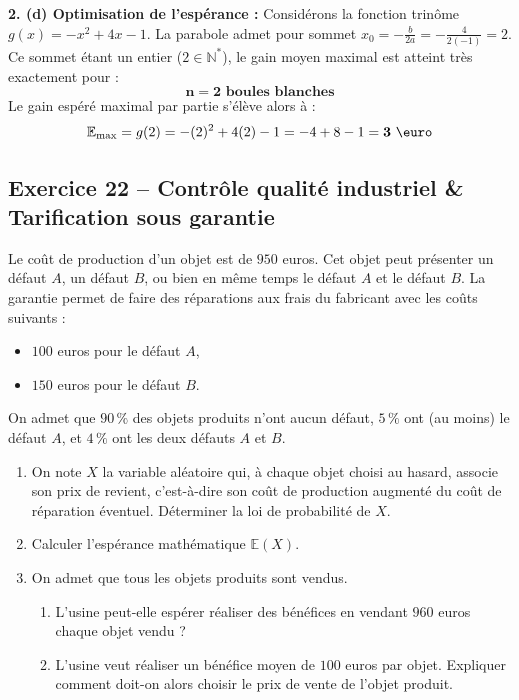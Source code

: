 \documentclass[11pt,a4paper]{article}
\newcommand{\N}{\mathbb{N}}
\newcommand{\E}{\mathbb{E}}
\begin{document}
\begin{correctionbox}
\textbf{2. (d) Optimisation de l'espérance :}
Considérons la fonction trinôme $g(x) = -x^2 + 4x - 1$.
La parabole admet pour sommet $x_0 = -\frac{b}{2a} = -\frac{4}{2(-1)} = 2$.
Ce sommet étant un entier ($2 \in \N^*$), le gain moyen maximal est atteint très exactement pour :
\[
\mathbf{n = 2 \text{ boules blanches}}
\]
Le gain espéré maximal par partie s'élève alors à :
\[
\E_{\max} = g(2) = -(2)^2 + 4(2) - 1 = -4 + 8 - 1 = \mathbf{3\text{ \euro}}
\]
\end{correctionbox}

\vspace{0.3cm}

\subsection*{Exercice 22 -- Contrôle qualité industriel \& Tarification sous garantie}

Le coût de production d'un objet est de $950$ euros. Cet objet peut présenter un défaut $A$, un défaut $B$, ou bien en même temps le défaut $A$ et le défaut $B$.
La garantie permet de faire des réparations aux frais du fabricant avec les coûts suivants :
\begin{itemize}[label=$\bullet$]
    \item $100$ euros pour le défaut $A$,
    \item $150$ euros pour le défaut $B$.
\end{itemize}
On admet que $90\,\%$ des objets produits n'ont aucun défaut, $5\,\%$ ont (au moins) le défaut $A$, et $4\,\%$ ont les deux défauts $A$ et $B$.
\begin{enumerate}[label=\arabic*.]
    \item On note $X$ la variable aléatoire qui, à chaque objet choisi au hasard, associe son prix de revient, c'est-à-dire son coût de production augmenté du coût de réparation éventuel. Déterminer la loi de probabilité de $X$.
    \item Calculer l'espérance mathématique $\E(X)$.
    \item On admet que tous les objets produits sont vendus.
    \begin{enumerate}
        \item L'usine peut-elle espérer réaliser des bénéfices en vendant $960$ euros chaque objet vendu ?
        \item L'usine veut réaliser un bénéfice moyen de $100$ euros par objet. Expliquer comment doit-on alors choisir le prix de vente de l'objet produit.
    \end{enumerate}
\end{enumerate}
\end{document}
